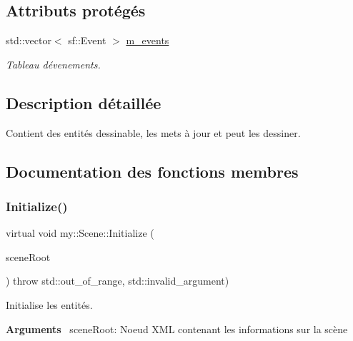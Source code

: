 \subsection*{Attributs protégés}
\begin{DoxyCompactItemize}
\item 
\mbox{\label{classmy_1_1Scene_a9f30fe8f2e3a54a0ae79bd5b34a13469}} 
std\+::vector$<$ sf\+::\+Event $>$ \hyperlink{classmy_1_1Scene_a9f30fe8f2e3a54a0ae79bd5b34a13469}{m\+\_\+events}
\begin{DoxyCompactList}\small\item\em Tableau d\textquotesingle{}évenements. \end{DoxyCompactList}\end{DoxyCompactItemize}


\subsection{Description détaillée}
Contient des entités dessinable, les mets à jour et peut les dessiner. 

\subsection{Documentation des fonctions membres}
\mbox{\label{classmy_1_1Scene_ac9401c5ec0e8a740fa338324a7df67a6}} 
\subsubsection{\texorpdfstring{Initialize()}{Initialize()}}
{\footnotesize\ttfamily virtual void my\+::\+Scene\+::\+Initialize (\begin{DoxyParamCaption}\item[{X\+M\+L\+Node\+::\+X\+M\+L\+Node\+Ptr}]{scene\+Root }\end{DoxyParamCaption}) throw  std\+::out\+\_\+of\+\_\+range, std\+::invalid\+\_\+argument) \hspace{0.3cm}{\ttfamily [pure virtual]}}



Initialise les entités. 

{\bfseries Arguments}~\newline
 scene\+Root\+: Noeud X\+ML contenant les informations sur la scène 

